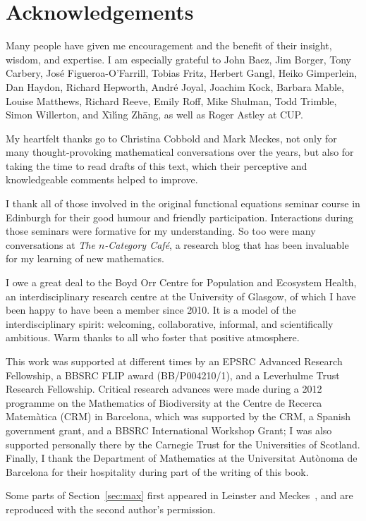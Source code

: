 \chapter*{Acknowledgements}

Many people have given me encouragement and the benefit of their insight,
wisdom, and expertise.  I am especially grateful to John Baez, Jim Borger,
Tony Carbery, Jos\'e Figueroa-O'Farrill, Tobias Fritz, Herbert Gangl, Heiko
Gimperlein, Dan Haydon, Richard Hepworth, Andr\'e Joyal, Joachim Kock,
Barbara Mable, Louise Matthews, Richard Reeve, Emily Roff, Mike Shulman,
Todd Trimble, Simon Willerton, and X\={\i}l\'{\i}ng Zh\={a}ng, as well as
Roger Astley at CUP.

My heartfelt thanks go to Christina%
%
%
Cobbold and Mark%
%
% 
Meckes, not only for many thought-provoking mathematical conversations over
the years, but also for taking the time to read drafts of this text, which
their perceptive and knowledgeable comments helped to improve.

I thank all of those involved in the original functional equations seminar
course in Edinburgh for their good humour and friendly participation.
Interactions during those seminars were formative for my understanding.  So
too were many conversations at \emph{The $n$-Category Caf\'e}, a research
blog that has been invaluable for my learning of new mathematics.

I owe a great deal to the Boyd Orr Centre for Population and Ecosystem
Health, an interdisciplinary research centre at the University of Glasgow,
of which I have been happy to have been a member since 2010.  It is a model
of the interdisciplinary spirit: welcoming, collaborative, informal, and
scientifically ambitious.  Warm thanks to all who foster that positive
atmosphere.

This work was supported at different times by an EPSRC Advanced Research
Fellowship, a BBSRC FLIP award (BB/P004210/1), and a Leverhulme Trust
Research Fellowship.  Critical research advances were made during a 2012
programme on the Mathematics of Biodiversity at the Centre
de Recerca Matem\`atica (CRM) in Barcelona, which was supported by the CRM,
a Spanish government grant, and a BBSRC International Workshop Grant; I was
also supported personally there by the Carnegie Trust for the Universities
of Scotland.  Finally, I thank the Department of Mathematics at the
Universitat Aut\`onoma de Barcelona for their hospitality during part of
the writing of this book.

Some parts of Section~\ref{sec:max} first appeared in Leinster and
Meckes~\cite{MDBB}, and are reproduced with the second author's permission.



